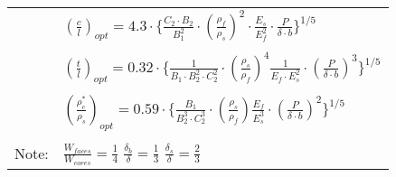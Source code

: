\documentclass[12pt]{article}
\begin{document}
\begin {tabular}{l l}

&\Large
$
(\frac{c}{l})_{opt} = 4.3\cdot \{ \frac{C_2 \cdot B_2}{B_1^2}\cdot (\frac{\rho_f}{\rho_s})^2 \cdot
\frac{E_s}{E_f^2} \cdot \frac{P}{\delta \cdot b}
\}^{1/5}$\\
\\

&\Large $(\frac{t}{l})_{opt} = 0.32 \cdot\{\frac{1}{B_1\cdot B_2^2 \cdot C_2^2} \cdot
  (\frac{\rho_s}{\rho_f})^4
  \frac{1}{E_f \cdot E_s^2} \cdot
( \frac{P}{\delta \cdot b}  )^3 \}^{1/5}$\\
\\

&\Large $(\frac{\rho_c^*}{\rho_s})_{opt} = 0.59 \cdot\{\frac{B_1}{B_2^3\cdot C_2^3} \cdot
  (\frac{\rho_s}{\rho_f})
  \frac{E_f}{E_s^3} \cdot
( \frac{P}{\delta \cdot b})^2 \}^{1/5}$\\
\\
Note: & \Large $\frac{W_{faces}}{W_{cores}}=
\frac {1}{4}$\hspace{0.5cm} $\frac{\delta_b}{\delta} =
 \frac{1}{3}$\hspace{0.5cm}
 $\frac{\delta_s}{\delta}=\frac{2}{3}$
\end {tabular}

\clearpage
\end{document}
